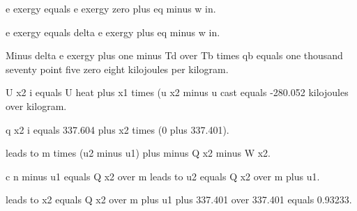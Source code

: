 e exergy equals e exergy zero plus eq minus w in.

e exergy equals delta e exergy plus eq minus w in.

Minus delta e exergy plus one minus Td over Tb times qb equals one thousand seventy point five zero eight kilojoules per kilogram.

U x2 i equals U heat plus x1 times (u x2 minus u cast equals -280.052 kilojoules over kilogram.

q x2 i equals 337.604 plus x2 times (0 plus 337.401).

leads to m times (u2 minus u1) plus minus Q x2 minus W x2.

c n minus u1 equals Q x2 over m leads to u2 equals Q x2 over m plus u1.

leads to x2 equals Q x2 over m plus u1 plus 337.401 over 337.401 equals 0.93233.